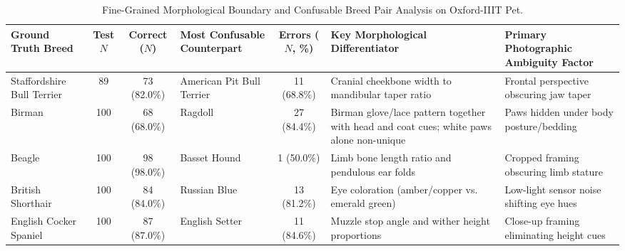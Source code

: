 \documentclass[conference]{IEEEtran}
\begin{document}
\begin{table}[t]
\centering
\caption{Fine-Grained Morphological Boundary and Confusable Breed Pair Analysis on Oxford-IIIT Pet.}
\label{tab:confusable_pairs}
\vspace{2pt}
\footnotesize
\setlength{\tabcolsep}{4pt}
\renewcommand{\arraystretch}{1.05}
\begin{tabularx}{\textwidth}{p{2.6cm} c c p{2.6cm} c X X}
\toprule
\textbf{Ground Truth Breed} & \textbf{Test $N$} & \textbf{Correct ($N$)} & \textbf{Most Confusable Counterpart} & \textbf{Errors ($N$, \%)} & \textbf{Key Morphological Differentiator} & \textbf{Primary Photographic Ambiguity Factor} \\
\midrule
Staffordshire Bull Terrier & 89 & 73 (82.0\%) & American Pit Bull Terrier & 11 (68.8\%) & Cranial cheekbone width to mandibular taper ratio & Frontal perspective obscuring jaw taper \\
Birman & 100 & 68 (68.0\%) & Ragdoll & 27 (84.4\%) & Birman glove/lace pattern together with head and coat cues; white paws alone non-unique~\cite{cfa_ragdoll, cfa_birman} & Paws hidden under body posture/bedding \\
Beagle & 100 & 98 (98.0\%) & Basset Hound & 1 (50.0\%) & Limb bone length ratio and pendulous ear folds & Cropped framing obscuring limb stature \\
British Shorthair & 100 & 84 (84.0\%) & Russian Blue & 13 (81.2\%) & Eye coloration (amber/copper vs. emerald green) & Low-light sensor noise shifting eye hues \\
English Cocker Spaniel & 100 & 87 (87.0\%) & English Setter & 11 (84.6\%) & Muzzle stop angle and wither height proportions & Close-up framing eliminating height cues \\
\bottomrule
\end{tabularx}
\end{table}
\end{document}

